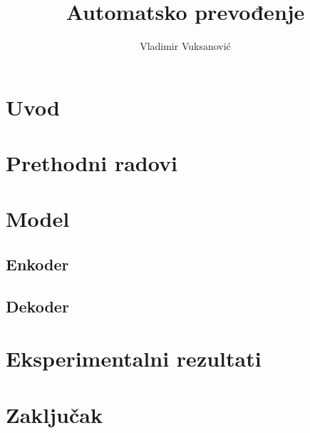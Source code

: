 \documentclass[a4paper]{article}
\title{Automatsko prevođenje}
\author{Vladimir Vuksanović}
\affil{Matematički fakultet}
\date{}
\begin{document}
\maketitle

\begin{abstract}

\end{abstract}

\section{Uvod}

\section{Prethodni radovi}

\section{Model}

\subsection {Enkoder}
\subsection {Dekoder}

\section{Eksperimentalni rezultati}

\section{Zaključak}

\medskip

\printbibliography
\end{document}
